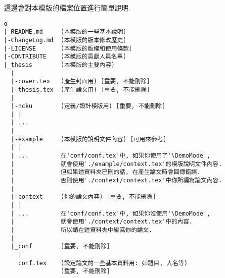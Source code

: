 
這邊會對本模版的檔案位置進行簡單說明.

\EmptyLine
\begin{fmpage}{\textwidth}
\begin{verbatim}
o
|-README.md     (本模版的一些基本說明)
|-ChangeLog.md  (本模版的版本修改歷史)
|-LICENSE       (本模版的版權和使用條款)
|-CONTRIBUTE    (本模版的貢獻人員名單)
|_thesis        (本模版的主要內容)
  |
  |-cover.tex   (產生封面用) [重要, 不能刪除]
  |-thesis.tex  (產生論文用) [重要, 不能刪除]
  | 
  |-ncku        (定義/設計模版用) [重要, 不能刪除]
  | |
  | ...
  |
  |-example     (本模版的說明文件內容) [可用來參考]
  | |
  | ...         在'conf/conf.tex'中, 如果你使用了'\DemoMode',
  |             就會使用'./example/context.tex'的模版說明文件內容.
  |             但如果這資料夾已刪的話, 在產生論文時會回傳錯誤.
  |             否則使用'./context/context.tex'中你所編寫論文內容.
  |
  |-context     (你的論文內容) [重要, 不能刪除]
  | |
  | ...         在'conf/conf.tex'中, 如果你沒使用'\DemoMode',
  |             就會使用'./context/context.tex'中的內容.
  |             所以請在這資料夾中編寫你的論文.
  |
  |_conf        [重要, 不能刪除]
    |
    conf.tex    (設定論文的一些基本資料用: 如題目, 人名等)
                [重要, 不能刪除]
\end{verbatim}
\end{fmpage}
